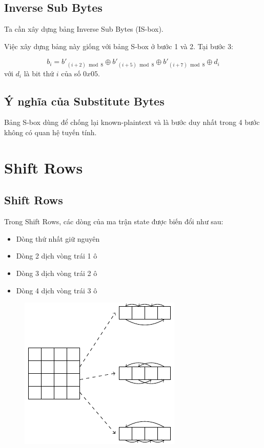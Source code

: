 \documentclass[a5paper]{article}
\begin{document}
    \subsection{Inverse Sub Bytes}

    Ta cần xây dựng bảng Inverse Sub Bytes (IS-box).

    Việc xây dựng bảng này giống với bảng S-box ở bước 1 và 2. Tại bước 3:

    \[ b_i = b'_{(i+2) \bmod 8} \oplus b'_{(i+5) \bmod 8} \oplus b'_{(i+7) \bmod 8} \oplus d_i \]
    với $d_i$ là bit thứ $i$ của số $0x05$.

    \subsection{Ý nghĩa của Substitute Bytes}

    Bảng S-box dùng để chống lại known-plaintext và là bước duy nhất trong 4 bước không có quan hệ tuyến tính.
    
    \section{Shift Rows}

    \subsection{Shift Rows}

    Trong Shift Rows, các dòng của ma trận state được biến đổi như sau:

    \begin{itemize}
        \item Dòng thứ nhất giữ nguyên
        \item Dòng 2 dịch vòng trái 1 ô
        \item Dòng 3 dịch vòng trái 2 ô
        \item Dòng 4 dịch vòng trái 3 ô
    \end{itemize}

    \begin{figure}[ht]
        \centering
        \includegraphics{shiftrows.pdf}
    \end{figure}
\end{document}

